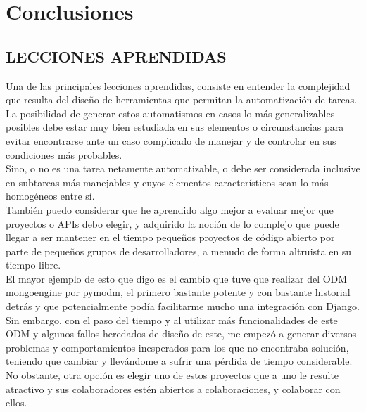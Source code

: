 \cleardoublepage
\chapter{Conclusiones}
\label{chap:conclusiones}

\section{LECCIONES APRENDIDAS}

Una de las principales lecciones aprendidas, consiste en entender la complejidad que resulta del diseño de herramientas que permitan la automatización de tareas.\\


La posibilidad de generar estos automatismos en casos lo más generalizables posibles debe estar muy bien estudiada en sus elementos o circunstancias para evitar encontrarse ante un caso complicado de manejar y de controlar en sus condiciones más probables.\\


Sino, o no es una tarea netamente automatizable, o debe ser considerada inclusive en subtareas más manejables y cuyos elementos característicos sean lo más homogéneos entre sí.\\


También puedo considerar que he aprendido algo mejor a evaluar mejor que proyectos o APIs debo elegir, y adquirido la noción de lo complejo que puede llegar a ser mantener en el tiempo pequeños proyectos de código abierto por parte de pequeños grupos de desarrolladores, a menudo de forma altruista en su tiempo libre.\\


El mayor ejemplo de esto que digo es el cambio que tuve que realizar del ODM mongoengine por pymodm, el primero bastante potente y con bastante historial detrás y que potencialmente podía facilitarme mucho una integración con Django.\\


Sin embargo, con el paso del tiempo y al utilizar más funcionalidades de este ODM y algunos fallos heredados de diseño de este, me empezó a generar diversos problemas y comportamientos inesperados para los que no encontraba solución, teniendo que cambiar y llevándome a sufrir una pérdida de tiempo considerable.\\


No obstante, otra opción es elegir uno de estos proyectos que a uno le resulte atractivo y sus colaboradores estén abiertos a colaboraciones, y colaborar con ellos.\\


